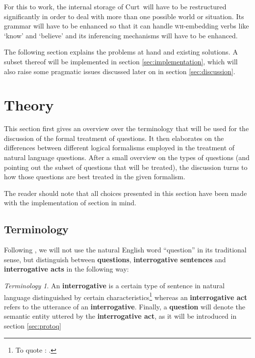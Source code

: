 \documentclass[12pt,a4paper]{article}
\newcommand{\term}[1]{\textsf{\textbf{#1}}} %
\newcommand{\pn}{\textsf} %
\newcommand{\wh}{\textsc{wh}} %
\newcommand{\curt}{\pn{Curt}\mbox{ }}
\theoremstyle{remark} \newtheorem*{termin}{Terminology} %
\begin{document}
For this to work, the internal storage of \curt will have to be restructured
significantly in order to deal with more than one possible world or situation.
Its grammar will have to be enhanced so that it can handle \wh-embedding verbs
like `know' and `believe' and its inferencing mechanisms will have to be
enhanced.

The following section explains the problems at hand and existing solutions. A
subset thereof will be implemented in section \ref{sec:implementation}, which
will also raise some pragmatic issues discussed later on in section
\ref{sec:discussion}.

\section{Theory}\label{sec:theory}

This section first gives an overview over the terminology that will be used for
the discussion of the formal treatment of questions. It then elaborates on the
differences between different logical formalisms employed in the treatment of
natural language questions. After a small overview on the types of questions
(and pointing out the subset of questions that will be treated), %
the discussion
turns to how those questions are best treated in the given formalism.

The reader should note that all choices presented in this section have been made
with the implementation of section \label{sec:implementation} in mind.


\subsection{Terminology}

Following \cite{gs:q}, we will not use the natural English word
``question'' in its traditional sense, but distinguish between \term{questions},
\term{interrogative sentences} and \term{interrogative acts} in the following
way:

\begin{termin}
  An \term{interrogative} is a certain type of sentence in natural language
  distinguished by certain characteristics\footnote{To quote \cite{gs:q}: .}
  whereas an \term{interrogative act} refers to the utterance of an
  \term{interrogative}. Finally, a
  \term{question} will denote the semantic entity uttered by the
  \term{interrogative act}, as it will be introduced in section
  \ref{sec:protoq}
\end{termin}
\end{document}
